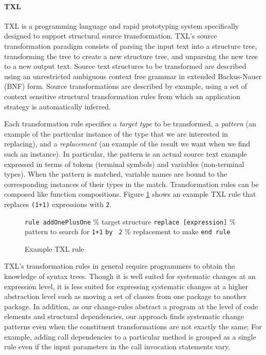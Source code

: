 \documentclass[runningheads,a4paper]{llncs}
\newcommand{\codefont}[1]{\footnotesize{\texttt{#1}}\normalsize}
\begin{document}
\paragraph{TXL} 

TXL is a programming language and rapid prototyping system specifically designed to support structural source transformation. TXL's source transformation paradigm consists of parsing the input text into a structure tree, transforming the tree to create a new structure tree, and unparsing the new tree to a new output text. Source text structures to be transformed are described using an unrestricted ambiguous context free grammar in extended Backus-Nauer (BNF) form. Source transformations are described by example, using a set of context sensitive structural transformation rules from which an application strategy is automatically inferred. 

Each transformation rule specifies a {\em target type} to be transformed, a {\em pattern} (an example of the particular instance of the type that we are interested in replacing), and a {\em replacement} (an example of the result we want when we find such an instance). In particular, the pattern is an actual source text example expressed in terms of tokens (terminal symbols) and variables (non-terminal types). When the pattern is matched, variable names are bound to the corresponding instances of their types in the match. Transformation rules can be composed like function compositions.  Figure \ref{txl_rule} shows an example TXL rule that replaces \codefont{(1+1)} expressions with \codefont{2}. 

\begin{figure} 
\codefont{rule addOnePlusOne} \% target structure \newline
\indent \codefont{replace [expression]}  \% pattern to search for \newline
\indent \indent \codefont{1+1} \newline
\indent \codefont{by } 
\indent \indent \codefont{2} \newline \% replacement to make \newline
\codefont{end rule} \newline
\caption{Example TXL rule} 
\label{txl_rule} 
\end{figure} 

TXL's transformation rules in general require programmers to obtain the knowledge of syntax trees. Though it is well suited for systematic changes at an expression level, it is less suited for expressing systematic changes at a higher abstraction level such as moving a set of classes from one package to another package. In addition, as our change-rules abstract a program at the level of code elements and structural dependencies, our approach finds systematic change patterns even when the constituent transformations are not exactly the same; For example, adding call dependencies to a particular method is grouped as a single rule even if the input parameters in the call invocation statements vary. 
\end{document}
